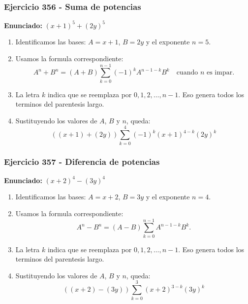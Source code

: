 \documentclass[11pt,a4paper]{article}
\begin{document}
\subsubsection*{Ejercicio 356 - Suma de potencias}
\textbf{Enunciado:} $ \left(x + 1\right)^{5}+\left(2 y\right)^{5} $\par
\begin{enumerate}[leftmargin=2em]
\item Identificamos las bases: \(A=x + 1\), \(B=2 y\) y el exponente \(n=5\).
\item Usamos la formula correspondiente: \[A^n+B^n=(A+B)\sum_{k=0}^{n-1}(-1)^kA^{n-1-k}B^k\quad\text{cuando }n\text{ es impar}.\]
\item La letra \(k\) indica que se reemplaza por \(0,1,2,\ldots,n-1\). Eso genera todos los terminos del parentesis largo.
\item Sustituyendo los valores de \(A\), \(B\) y \(n\), queda: \[\boxed{\left(\left(x + 1\right)+\left(2 y\right)\right)\sum_{k=0}^{4}(-1)^k\left(x + 1\right)^{4-k}\left(2 y\right)^k}\]
\end{enumerate}

\vspace{0.2cm}
\subsubsection*{Ejercicio 357 - Diferencia de potencias}
\textbf{Enunciado:} $ \left(x + 2\right)^{4}-\left(3 y\right)^{4} $\par
\begin{enumerate}[leftmargin=2em]
\item Identificamos las bases: \(A=x + 2\), \(B=3 y\) y el exponente \(n=4\).
\item Usamos la formula correspondiente: \[A^n-B^n=(A-B)\sum_{k=0}^{n-1}A^{n-1-k}B^k.\]
\item La letra \(k\) indica que se reemplaza por \(0,1,2,\ldots,n-1\). Eso genera todos los terminos del parentesis largo.
\item Sustituyendo los valores de \(A\), \(B\) y \(n\), queda: \[\boxed{\left(\left(x + 2\right)-\left(3 y\right)\right)\sum_{k=0}^{3}\left(x + 2\right)^{3-k}\left(3 y\right)^k}\]
\end{enumerate}

\vspace{0.2cm}
\end{document}
